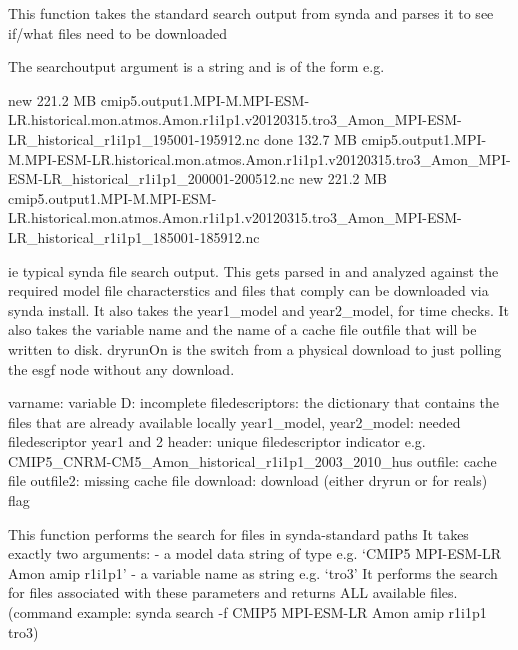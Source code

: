 \documentclass[letterpaper,10pt,english]{sphinxmanual}
\begin{document}

\begin{fulllineitems}
\label{\detokenize{index:cmip5datafinder.synda_dll}}
This function takes the standard search output from synda
and parses it to see if/what files need to be downloaded

The searchoutput argument is a string and is of the form e.g.

new   221.2 MB  cmip5.output1.MPI-M.MPI-ESM-LR.historical.mon.atmos.Amon.r1i1p1.v20120315.tro3\_Amon\_MPI-ESM-LR\_historical\_r1i1p1\_195001-195912.nc
done  132.7 MB  cmip5.output1.MPI-M.MPI-ESM-LR.historical.mon.atmos.Amon.r1i1p1.v20120315.tro3\_Amon\_MPI-ESM-LR\_historical\_r1i1p1\_200001-200512.nc
new   221.2 MB  cmip5.output1.MPI-M.MPI-ESM-LR.historical.mon.atmos.Amon.r1i1p1.v20120315.tro3\_Amon\_MPI-ESM-LR\_historical\_r1i1p1\_185001-185912.nc

ie typical synda file search output. This gets parsed in and analyzed
against the required model file characterstics and files that comply can
be downloaded via synda install. It also takes the year1\_model and year2\_model, for time checks.
It also takes the variable name and the name of a cache file outfile that will be written to disk.
dryrunOn is the switch from a physical download to just polling the esgf node without any download.

varname: variable
D: incomplete filedescriptors: the dictionary that contains the files that are already available locally
year1\_model, year2\_model: needed filedescriptor year1 and 2
header: unique filedescriptor indicator e.g. CMIP5\_CNRM-CM5\_Amon\_historical\_r1i1p1\_2003\_2010\_hus
outfile: cache file
outfile2: missing cache file
download: download (either dryrun or for reals) flag

\end{fulllineitems}


\begin{fulllineitems}
\label{\detokenize{index:cmip5datafinder.synda_search}}
This function performs the search for files in synda-standard paths
It takes exactly two arguments:
- a model data string of type e.g. `CMIP5 MPI-ESM-LR Amon amip r1i1p1'
- a variable name as string e.g. `tro3'
It performs the search for files associated with these parameters and returns ALL
available files. (command example: synda search -f CMIP5 MPI-ESM-LR Amon amip r1i1p1 tro3)

\end{fulllineitems}
\end{document}
